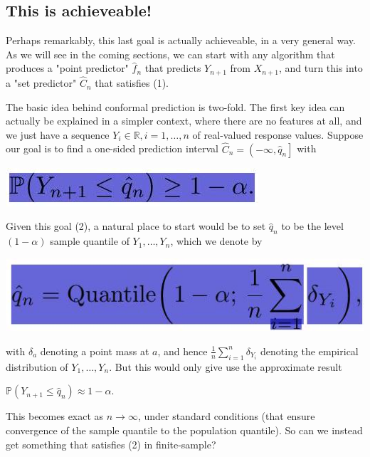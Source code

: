 \documentclass[10pt]{article}
\begin{document}
\subsection{This is achieveable!}
Perhaps remarkably, this last goal is actually achieveable, in a very general way. As we will see in the coming sections, we can start with any algorithm that produces a "point predictor" $\hat{f}_{n}$ that predicts $Y_{n+1}$ from $X_{n+1}$, and turn this into a "set predictor" $\hat{C}_{n}$ that satisfies (1).

The basic idea behind conformal prediction is two-fold. The first key idea can actually be explained in a simpler context, where there are no features at all, and we just have a sequence $Y_{i} \in \mathbb{R}, i=1, \ldots, n$ of real-valued response values. Suppose our goal is to find a one-sided prediction interval $\hat{C}_{n}=\left(-\infty, \hat{q}_{n}\right]$ with

\begin{center}
\includegraphics[max width=\textwidth]{2023_10_05_3f4b7f0ae8e12ec8ac84g-02}
\end{center}

Given this goal (2), a natural place to start would be to set $\hat{q}_{n}$ to be the level $(1-\alpha)$ sample quantile of $Y_{1}, \ldots, Y_{n}$, which we denote by

\begin{center}
\includegraphics[max width=\textwidth]{2023_10_05_3f4b7f0ae8e12ec8ac84g-02(1)}
\end{center}

with $\delta_{a}$ denoting a point mass at $a$, and hence $\frac{1}{n} \sum_{i=1}^{n} \delta_{Y_{i}}$ denoting the empirical distribution of $Y_{1}, \ldots, Y_{n}$. But this would only give use the approximate result

$\mathbb{P}\left(Y_{n+1} \leq \hat{q}_{n}\right) \approx 1-\alpha$.

This becomes exact as $n \rightarrow \infty$, under standard conditions (that ensure convergence of the sample quantile to the population quantile). So can we instead get something that satisfies (2) in finite-sample?
\end{document}
